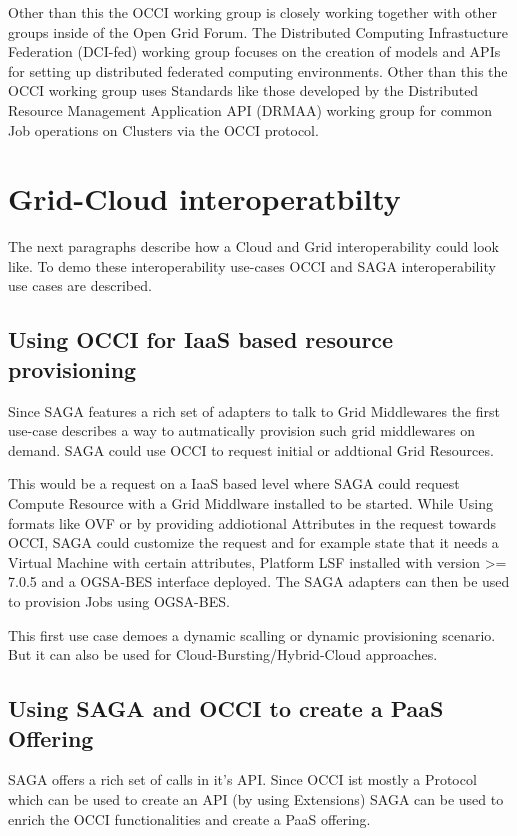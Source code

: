 \documentclass[10pt,conference,final,letterpaper,twoside,twocolumn,]{IEEEtran}
\begin{document}
Other than this the OCCI working group is closely working together
with other groups inside of the Open Grid Forum. The Distributed
Computing Infrastucture Federation (DCI-fed) working group focuses on
the creation of models and APIs for setting up distributed federated
computing environments. Other than this the OCCI working group uses
Standards like those developed by the Distributed Resource Management
Application API (DRMAA) working group for common Job operations on
Clusters via the OCCI protocol.

\section{Grid-Cloud interoperatbilty}
\label{sec:gcinterop}

The next paragraphs describe how a Cloud and Grid interoperability
could look like. To demo these interoperability use-cases OCCI and
SAGA interoperability use cases are described.

\subsection{Using OCCI for IaaS based resource provisioning}
Since SAGA features a rich set of adapters to talk to Grid Middlewares
the first use-case describes a way to autmatically provision such grid
middlewares on demand. SAGA could use OCCI to request initial or
addtional Grid Resources.

This would be a request on a IaaS based level where SAGA could request
Compute Resource with a Grid Middlware installed to be started. While
Using formats like OVF or by providing addiotional Attributes in the
request towards OCCI, SAGA could customize the request and for example
state that it needs a Virtual Machine with certain attributes,
Platform LSF installed with version >= 7.0.5 and a OGSA-BES interface
deployed. The SAGA adapters can then be used to provision Jobs using
OGSA-BES.

This first use case demoes a dynamic scalling or dynamic provisioning
scenario. But it can also be used for Cloud-Bursting/Hybrid-Cloud
approaches.

\subsection{Using SAGA and OCCI to create a PaaS Offering}
SAGA offers a rich set of calls in it's API. Since OCCI ist mostly a
Protocol which can be used to create an API (by using Extensions) SAGA
can be used to enrich the OCCI functionalities and create a PaaS
offering.
\end{document}
